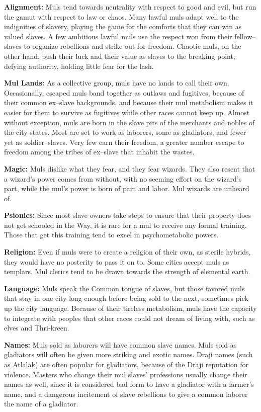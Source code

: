 \documentclass[10pt,a4paper,twocolumn]{d20}
\begin{document}
{\textbf{Alignment:} Muls tend towards neutrality with respect to good and evil, but run the gamut with respect to law or chaos. Many lawful muls adapt well to the indignities of slavery, playing the game for the comforts that they can win as valued slaves. A few ambitious lawful muls use the respect won from their fellow–slaves to organize rebellions and strike out for freedom. Chaotic muls, on the other hand, push their luck and their value as slaves to the breaking point, defying authority, holding little fear for the lash.

\textbf{Mul Lands:} As a collective group, muls have no lands to call their own. Occasionally, escaped muls band together as outlaws and fugitives, because of their common ex–slave backgrounds, and because their mul metabolism makes it easier for them to survive as fugitives while other races cannot keep up. Almost without exception, muls are born in the slave pits of the merchants and nobles of the city‐states. Most are set to work as laborers, some as gladiators, and fewer yet as soldier–slaves. Very few earn their freedom, a greater number escape to freedom among the tribes of ex–slave that inhabit the wastes.

\textbf{Magic:} Muls dislike what they fear, and they fear wizards. They also resent that a wizard’s power comes from without, with no seeming effort on the wizard’s part, while the mul’s power is born of pain and labor. Mul wizards are unheard of.

\textbf{Psionics:} Since most slave owners take steps to ensure that their property does not get schooled in the Way, it is rare for a mul to receive any formal training. Those that get this training tend to excel in psychometabolic powers.

\textbf{Religion:} Even if muls were to create a religion of their own, as sterile hybrids, they would have no posterity to pass it on to. Some cities accept muls as templars. Mul clerics tend to be drawn towards the strength of elemental earth.

\textbf{Language:} Muls speak the Common tongue of slaves, but those favored muls that stay in one city long enough before being sold to the next, sometimes pick up the city language. Because of their tireless metabolism, muls have the capacity to integrate with peoples that other races could not dream of living with, such as elves and Thri‐kreen.

\textbf{Names:} Muls sold as laborers will have common slave names. Muls sold as gladiators will often be given more striking and exotic names. Draji names (such as Atlalak) are often popular for gladiators, because of the Draji reputation for violence. Masters who change their mul slaves’ professions usually change their names as well, since it is considered bad form to have a gladiator with a farmer’s name, and a dangerous incitement of slave rebellions to give a common laborer the name of a gladiator.

}
\end{document}
